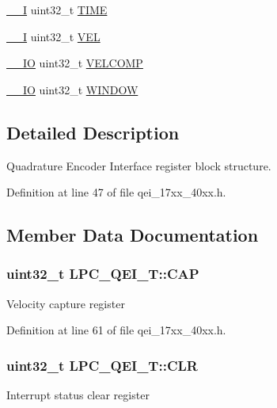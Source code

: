 \begin{DoxyCompactItemize}
\hyperlink{core__cm3_8h_af63697ed9952cc71e1225efe205f6cd3}{\+\_\+\+\_\+I} uint32\+\_\+t \hyperlink{structLPC__QEI__T_a73a528b77fc560d229dc287237a9879e}{T\+I\+ME}
\item 
\hyperlink{core__cm3_8h_af63697ed9952cc71e1225efe205f6cd3}{\+\_\+\+\_\+I} uint32\+\_\+t \hyperlink{structLPC__QEI__T_a15e45a6723e72a83eb3c2671b1c1f43d}{V\+EL}
\item 
\hyperlink{core__cm3_8h_aec43007d9998a0a0e01faede4133d6be}{\+\_\+\+\_\+\+IO} uint32\+\_\+t \hyperlink{structLPC__QEI__T_a5237f6f2f6ed6530bbf6a13d0e20151f}{V\+E\+L\+C\+O\+MP}
\item 
\hyperlink{core__cm3_8h_aec43007d9998a0a0e01faede4133d6be}{\+\_\+\+\_\+\+IO} uint32\+\_\+t \hyperlink{structLPC__QEI__T_af75222d15c3a2744586a5f27a0549c18}{W\+I\+N\+D\+OW}
\end{DoxyCompactItemize}


\subsection{Detailed Description}
Quadrature Encoder Interface register block structure. 

Definition at line 47 of file qei\+\_\+17xx\+\_\+40xx.\+h.



\subsection{Member Data Documentation}
\subsubsection[{\texorpdfstring{C\+AP}{CAP}}]{ uint32\+\_\+t L\+P\+C\+\_\+\+Q\+E\+I\+\_\+\+T\+::\+C\+AP}\hypertarget{structLPC__QEI__T_a3496f3632323f5c9b09c816f57b90b2d}{}\label{structLPC__QEI__T_a3496f3632323f5c9b09c816f57b90b2d}
Velocity capture register 

Definition at line 61 of file qei\+\_\+17xx\+\_\+40xx.\+h.

\subsubsection[{\texorpdfstring{C\+LR}{CLR}}]{ uint32\+\_\+t L\+P\+C\+\_\+\+Q\+E\+I\+\_\+\+T\+::\+C\+LR}\hypertarget{structLPC__QEI__T_a909f2a48a6a21651d6baf9a3a94e6cb0}{}\label{structLPC__QEI__T_a909f2a48a6a21651d6baf9a3a94e6cb0}
Interrupt status clear register 

